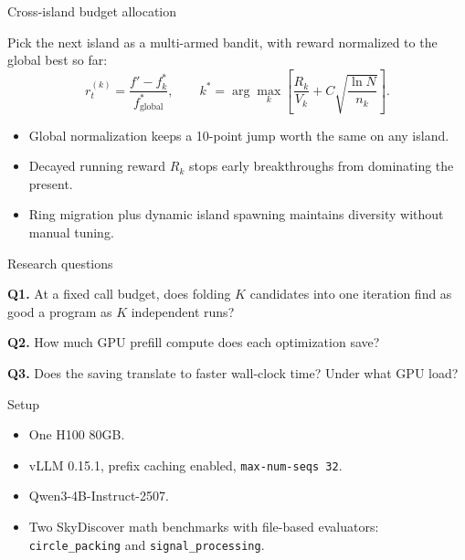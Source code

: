 \documentclass[10pt,aspectratio=169]{beamer}
\begin{document}
\begin{frame}{Cross-island budget allocation}

Pick the next island as a multi-armed bandit, with reward
normalized to the global best so far:
\[
  r_t^{(k)} = \frac{f' - f^{*}_{k}}{f^{*}_{\mathrm{global}}},
  \qquad
  k^{*} = \arg\max_k\!\left[\frac{R_k}{V_k} + C\sqrt{\frac{\ln N}{n_k}}\right].
\]

\vspace{0.4em}
\begin{itemize}\setlength\itemsep{0.3em}
  \item Global normalization keeps a 10-point jump worth the same
    on any island.
  \item Decayed running reward $R_k$ stops early breakthroughs from
    dominating the present.
  \item Ring migration plus dynamic island spawning maintains
    diversity without manual tuning.
\end{itemize}

\end{frame}

\begin{frame}{Research questions}

\textbf{Q1.} At a fixed call budget, does folding $K$ candidates
into one iteration find as good a program as $K$ independent runs?

\vspace{0.7em}
\textbf{Q2.} How much GPU prefill compute does each optimization
save?

\vspace{0.7em}
\textbf{Q3.} Does the saving translate to faster wall-clock time?
Under what GPU load?

\end{frame}

\begin{frame}{Setup}

\begin{itemize}\setlength\itemsep{0.4em}
  \item One H100 80GB.
  \item vLLM 0.15.1, prefix caching enabled, \texttt{max-num-seqs 32}.
  \item Qwen3-4B-Instruct-2507. 
  \item Two SkyDiscover math benchmarks with file-based evaluators:
    \texttt{circle\_packing} and \texttt{signal\_processing}.
\end{itemize}

\end{frame}
\end{document}
